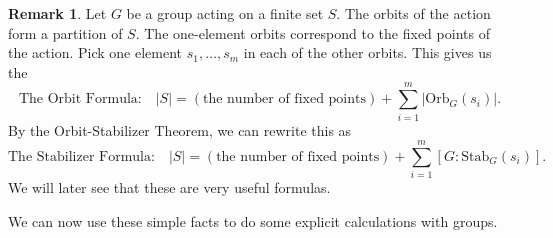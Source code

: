 \documentclass[12pt]{report}
\numberwithin{equation}{section}
\numberwithin{theorem}{chapter}
\theoremstyle{definition}
\newtheorem*{basic properties}{Basic Properties}
\newtheorem*{Important Remark}{Important Remark}
\newtheorem{remark}[theorem]{Remark}
\begin{document}
\begin{remark}\label{Orbit Equation}
Let $G$ be a group acting on a finite set $S$. The orbits of the action form a partition of $S$. The one-element orbits correspond to the fixed points of the action. Pick one element $s_1, \ldots, s_m$ in each of the other orbits. This gives us the
$$\text{The Orbit Formula:} \hspace{1em} |S| = (\text{the number of fixed points}) + \sum_{i=1}^m |\mathrm{Orb}_G(s_i)|.$$
By the Orbit-Stabilizer Theorem, we can rewrite this as
$$\text{The Stabilizer Formula:} \hspace{1em} |S| = (\text{the number of fixed points}) + \sum_{i=1}^m [G: \mathrm{Stab}_G(s_i)].$$
We will later see that these are very useful formulas.
\end{remark}

We can now use these simple facts to do some explicit calculations with groups.
\end{document}
